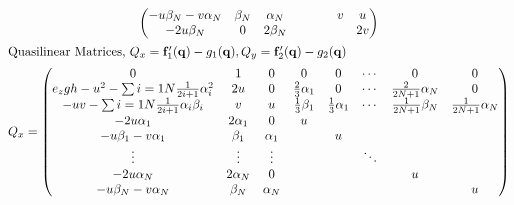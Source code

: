 \documentclass[oneside]{article}
\begin{document}
\begin{gather*}
\begin{pmatrix}
    -u \beta_N - v \alpha_N                                        & \beta_N & \alpha_N  &                       &                        &        & v                      & u                        \\
    -2 u \beta_N                                                   & 0       & 2 \beta_N &                       &                        &        &                        & 2v                       \\
  \end{pmatrix} \\
  \intertext{Quasilinear Matrices, \(Q_x = \mathbf{f}_1'(\mathbf{q}) - g_1(\mathbf{q}), Q_y = \mathbf{f}_2'(\mathbf{q}) - g_2(\mathbf{q})\)}
  Q_x =
  \begin{pmatrix}
    0                                                               & 1          & 0        & 0                     & 0                      & \cdots & 0                         & 0                       \\
    e_{z} g h - u^{2} - \sum{i = 1}{N}{\frac{1}{2i + 1} \alpha_i^2} & 2 u        & 0        & \frac{2}{3} \alpha_1  & 0                      & \cdots & \frac{2}{2N + 1} \alpha_N & 0                       \\
    -uv - \sum{i = 1}{N}{\frac{1}{2i + 1} \alpha_i \beta_i}         & v          & u        & \frac{1}{3} \beta_{1} & \frac{1}{3} \alpha_{1} & \cdots & \frac{1}{2N+1} \beta_N    & \frac{1}{2N+1} \alpha_N \\
    -2 u \alpha_1                                                   & 2 \alpha_1 & 0        & u                     &                        &        &                           &                         \\
    -u \beta_1 - v \alpha_1                                         & \beta_1    & \alpha_1 &                       & u                      &        &                           &                         \\
    \vdots                                                          & \vdots     & \vdots   &                       &                        & \ddots &                           &                         \\
    -2 u \alpha_N                                                   & 2 \alpha_N & 0        &                       &                        &        & u                         &                         \\
    -u \beta_N - v \alpha_N                                         & \beta_N    & \alpha_N &                       &                        &        &                           & u                       \\

\end{pmatrix}
\end{gather*}
\end{document}
